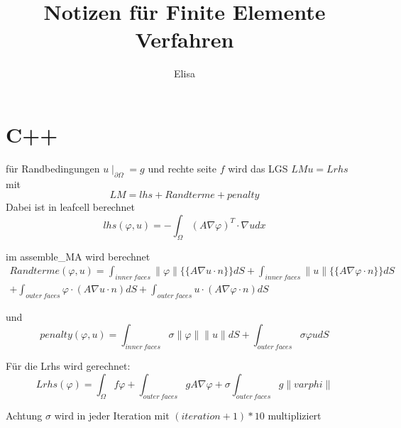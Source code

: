 \documentclass[a4paper,11pt]{article}
\title{Notizen für Finite Elemente Verfahren}
\author{Elisa}
\begin{document}
\maketitle

\section*{C++}

für Randbedingungen $u\mid_{\partial \Omega}=g$ und rechte seite $f$ 
wird das LGS $LM u = Lrhs$ mit
\[
	LM = lhs + Randterme + penalty
\]
Dabei ist in leafcell berechnet
\[
	lhs(\varphi,u) = -\int_\Omega (A \nabla \varphi)^T \cdot \nabla u dx
\]

im assemble\_MA wird berechnet
\begin{align*}
	Randterme(\varphi,u) = \int_{inner \: faces} \lVert \varphi \rVert \{\{A\nabla u \cdot n\}\} dS 
										+ \int_{inner \: faces} \lVert u \rVert \{\{A\nabla \varphi \cdot n\}\} dS \\
										+ \int_{outer \: faces} \varphi \cdot (A\nabla u \cdot n) dS 
										+ \int_{outer \: faces} u \cdot (A\nabla \varphi \cdot n) dS	
\end{align*}

und
\[
	penalty(\varphi,u) = \int_{inner \: faces} \sigma \lVert \varphi \rVert \lVert u \rVert dS
	                  + \int_{outer \: faces} \sigma \varphi u dS
\]

Für die Lrhs wird gerechnet:
\[
	Lrhs(\varphi) = \int_\Omega f \varphi 
	             +\int_{outer \: faces} g A \nabla \varphi 
	             + \sigma \int_{outer \: faces} g \lVert varphi \rVert
\]

Achtung $\sigma$ wird in jeder Iteration mit $(iteration+1)*10$ multipliziert
\end{document}
